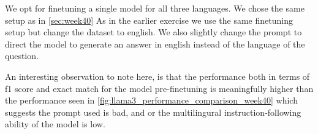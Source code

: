 \documentclass[11pt]{article}
\begin{document}
We opt for finetuning a single model for all three languages. We chose the same setup as in \ref{sec:week40}
As in the earlier exercise we use the same finetuning setup but change the dataset to english. 
We also slightly change the prompt to direct the model to generate an answer in english instead of the language of the question.


\begin{table}[ht]
    \centering
    \label{tab:week41_performance_comparison}
    \caption{Performance comparison of pre-finetuned and finetuned models for English answer generation}
\end{table}

An interesting observation to note here, is that the performance both in terms of f1 score and exact match for the model pre-finetuning is meaningfully higher 
than the performance seen in \ref{fig:llama3_performance_comparison_week40} which suggests the prompt used is bad, and or the multilingural instruction-following ability of the model is low. 

\begin{table}[ht]
    \centering
    \label{tab:week41_non_answerable_performance}
    \caption{Performance comparison of pre-finetuned and finetuned models for English answer generation}
\end{table}
\end{document}
